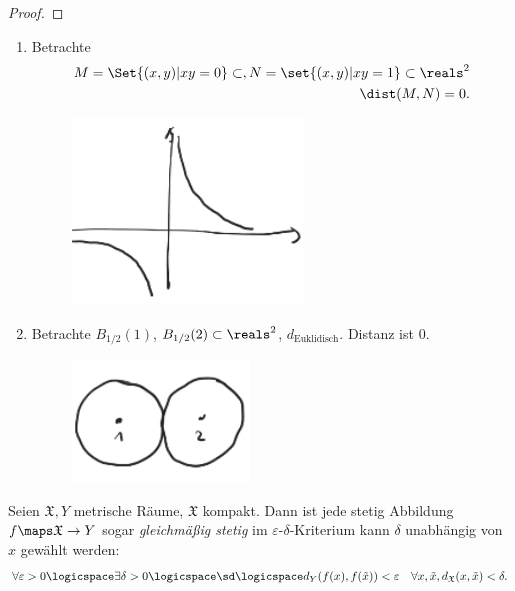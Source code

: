 \begin{beispiel*}
\begin{proof}
    \end{proof}
    \begin{achtung*}
        \begin{enumerate}
            \item Betrachte
            \begin{align*}
                M=\Set{(x,y)|xy=0}\subset , N=\set{(x,y)|xy=1}\subset \reals^2\\
                \dist(M,N)=0.
            \end{align*}
            \begin{figure}[H]
                \centering
                \includegraphics[width=0.3\linewidth]{figures/achsen_und_eins_durch_x}
                \caption*{}
                \label{fig:achsen_und_eins_durch_x}
            \end{figure}
            
            \item Betrachte \( B_{1/2}(1) \), \( B_{1/2}(2)\subset \reals^2 \), \( d_{\text{Euklidisch}} \). Distanz ist \( 0 \).
            \begin{figure}[H]
                \centering
                \includegraphics[width=0.3\linewidth]{figures/beruehrende_kreise}
                \label{fig:beruehrende_kreise}
            \end{figure}
            
        \end{enumerate}
    \end{achtung*}    
\end{beispiel*}
\begin{satzdef}
    Seien \( \mathfrak{X},Y \) metrische Räume, \( \mathfrak{X} \) kompakt. Dann ist jede stetig Abbildung \( f\maps \mathfrak{X}\to Y \) sogar \emph{gleichmäßig stetig} \dh im \( \varepsilon \)-\( \delta \)-Kriterium kann \( \delta \) unabhängig von \( x \) gewählt werden:
    \begin{align*}
        \forall \varepsilon>0\logicspace \exists \delta>0\logicspace \sd\logicspace d_Y(f(x),f(\tilde{x}))<\varepsilon\quad \forall x,\tilde{x},d_{\mathfrak{X}}(x,\tilde{x})<\delta.
    \end{align*}
\end{satzdef}
